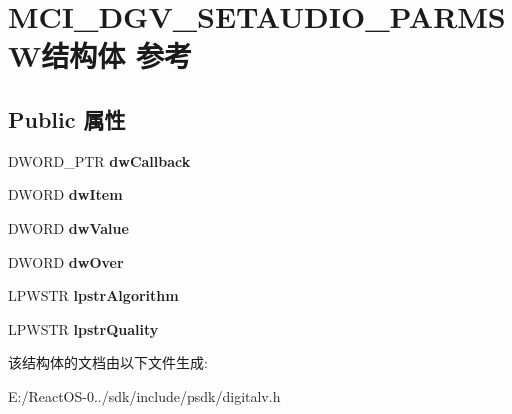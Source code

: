 \hypertarget{struct_m_c_i___d_g_v___s_e_t_a_u_d_i_o___p_a_r_m_s_w}{}\section{M\+C\+I\+\_\+\+D\+G\+V\+\_\+\+S\+E\+T\+A\+U\+D\+I\+O\+\_\+\+P\+A\+R\+M\+S\+W结构体 参考}
\label{struct_m_c_i___d_g_v___s_e_t_a_u_d_i_o___p_a_r_m_s_w}
\subsection*{Public 属性}
\begin{DoxyCompactItemize}
\item 
\mbox{\label{struct_m_c_i___d_g_v___s_e_t_a_u_d_i_o___p_a_r_m_s_w_a6dee4384f5cfbb19c94a4aaa70a08fe5}} 
D\+W\+O\+R\+D\+\_\+\+P\+TR {\bfseries dw\+Callback}
\item 
\mbox{\label{struct_m_c_i___d_g_v___s_e_t_a_u_d_i_o___p_a_r_m_s_w_a7044630b3bf23d98ae2755a070737d67}} 
D\+W\+O\+RD {\bfseries dw\+Item}
\item 
\mbox{\label{struct_m_c_i___d_g_v___s_e_t_a_u_d_i_o___p_a_r_m_s_w_a91aa4d3faa54c944797928f860aff63d}} 
D\+W\+O\+RD {\bfseries dw\+Value}
\item 
\mbox{\label{struct_m_c_i___d_g_v___s_e_t_a_u_d_i_o___p_a_r_m_s_w_abd6f03edb26493b57ec9717e13209c94}} 
D\+W\+O\+RD {\bfseries dw\+Over}
\item 
\mbox{\label{struct_m_c_i___d_g_v___s_e_t_a_u_d_i_o___p_a_r_m_s_w_a49160d542a4207c0c885954cac77e5f7}} 
L\+P\+W\+S\+TR {\bfseries lpstr\+Algorithm}
\item 
\mbox{\label{struct_m_c_i___d_g_v___s_e_t_a_u_d_i_o___p_a_r_m_s_w_ae06778a41e1c0964f62b1b56c7bb1919}} 
L\+P\+W\+S\+TR {\bfseries lpstr\+Quality}
\end{DoxyCompactItemize}


该结构体的文档由以下文件生成\+:\begin{DoxyCompactItemize}
\item 
E\+:/\+React\+O\+S-\/0../sdk/include/psdk/digitalv.\+h\end{DoxyCompactItemize}
